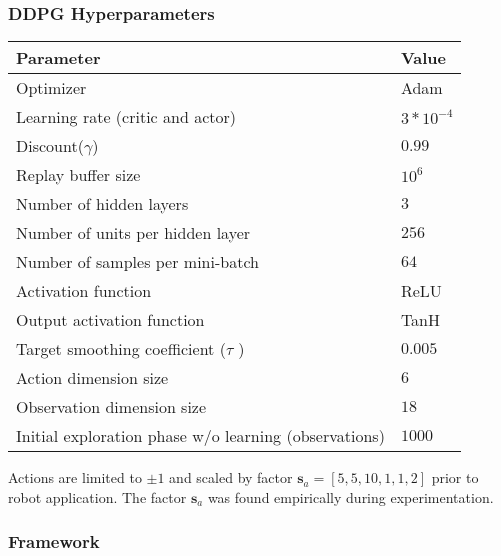 \subsubsection*{DDPG Hyperparameters}

\begin{center}
\begin{tabular}{l|l} 
 \hline
 Parameter & Value\\ 
  \hline
 Optimizer & Adam~\cite{Kingma.2014}   \\ 
 Learning rate (critic and actor)& $3*10^{-4}$  \\ 
 Discount($\gamma$) & $0.99$  \\ 
 Replay buffer size & $10^6$  \\ 
 Number of hidden layers & $3$  \\ 
 Number of units per hidden layer & $256$  \\ 
 Number of samples per mini-batch & $64$  \\ 
 Activation function & ReLU  \\ 
 Output activation function & TanH  \\ 

 Target smoothing coefficient ($\tau$ ) & $0.005$  \\ 
 \hline
 Action dimension size & $6$  \\ 
 Observation dimension size & $18$\\
 Initial exploration phase w/o learning (observations) & $1000$ \\
 
 \hline
\end{tabular}
\end{center}

Actions are limited to $\pm 1$ and scaled by factor $\boldsymbol{s}_a =[5,5,10,1,1,2]$ prior to robot application.
The factor $\boldsymbol{s}_a$ was found empirically during experimentation.

\subsubsection{\skillmodelabbr{} Framework}

